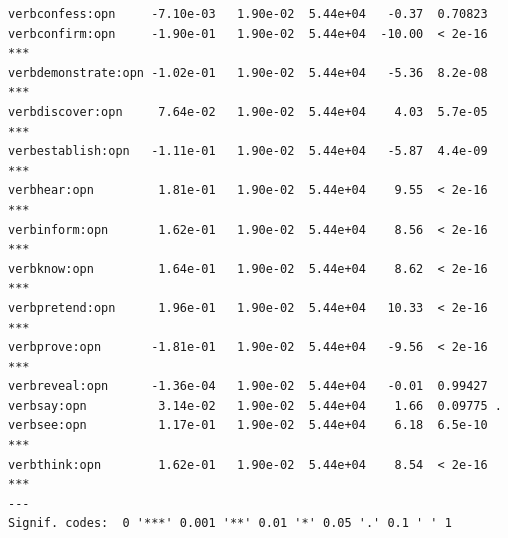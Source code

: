 \documentclass[10pt]{article}\usepackage[]{graphicx}\usepackage[dvipsnames]{xcolor}
\makeatletter
\newenvironment{kframe}{%
 \def\at@end@of@kframe{}%
 \ifinner\ifhmode%
  \def\at@end@of@kframe{\end{minipage}}%
  \begin{minipage}{\columnwidth}%
 \fi\fi%
 \def\FrameCommand##1{\hskip\@totalleftmargin \hskip-\fboxsep
 \colorbox{shadecolor}{##1}\hskip-\fboxsep
     \hskip-\linewidth \hskip-\@totalleftmargin \hskip\columnwidth}%
 \MakeFramed {\advance\hsize-\width
   \@totalleftmargin\z@ \linewidth\hsize
   \@setminipage}}%
 {\par\unskip\endMakeFramed%
 \at@end@of@kframe}
\newenvironment{knitrout}{}{} %
\makeatother
\begin{document}
\begin{knitrout}
\begin{kframe}
\begin{verbatim}
verbconfess:opn     -7.10e-03   1.90e-02  5.44e+04   -0.37  0.70823    
verbconfirm:opn     -1.90e-01   1.90e-02  5.44e+04  -10.00  < 2e-16 ***
verbdemonstrate:opn -1.02e-01   1.90e-02  5.44e+04   -5.36  8.2e-08 ***
verbdiscover:opn     7.64e-02   1.90e-02  5.44e+04    4.03  5.7e-05 ***
verbestablish:opn   -1.11e-01   1.90e-02  5.44e+04   -5.87  4.4e-09 ***
verbhear:opn         1.81e-01   1.90e-02  5.44e+04    9.55  < 2e-16 ***
verbinform:opn       1.62e-01   1.90e-02  5.44e+04    8.56  < 2e-16 ***
verbknow:opn         1.64e-01   1.90e-02  5.44e+04    8.62  < 2e-16 ***
verbpretend:opn      1.96e-01   1.90e-02  5.44e+04   10.33  < 2e-16 ***
verbprove:opn       -1.81e-01   1.90e-02  5.44e+04   -9.56  < 2e-16 ***
verbreveal:opn      -1.36e-04   1.90e-02  5.44e+04   -0.01  0.99427    
verbsay:opn          3.14e-02   1.90e-02  5.44e+04    1.66  0.09775 .  
verbsee:opn          1.17e-01   1.90e-02  5.44e+04    6.18  6.5e-10 ***
verbthink:opn        1.62e-01   1.90e-02  5.44e+04    8.54  < 2e-16 ***
---
Signif. codes:  0 '***' 0.001 '**' 0.01 '*' 0.05 '.' 0.1 ' ' 1
\end{verbatim}
\end{kframe}
\end{knitrout}
\end{document}
